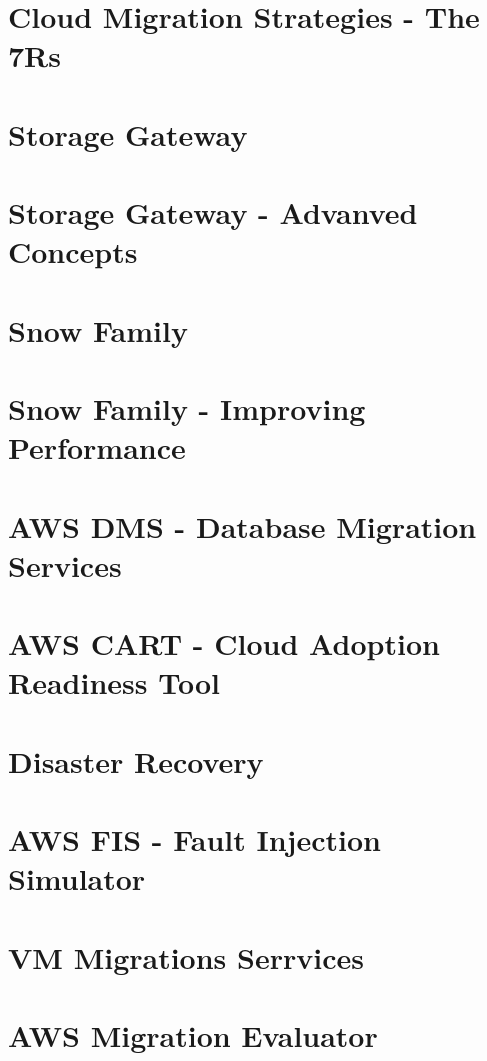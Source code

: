 \documentclass[11pt]{book}
\begin{document}
    \section{Cloud Migration Strategies - The 7Rs}


    \section{Storage Gateway}


    \section{Storage Gateway - Advanved Concepts}


    \section{Snow Family}


    \section{Snow Family - Improving Performance}


    \section{AWS DMS - Database Migration Services}


    \section{AWS CART - Cloud Adoption Readiness Tool}


    \section{Disaster Recovery}


    \section{AWS FIS - Fault Injection Simulator}


    \section{VM Migrations Serrvices}


    \section{AWS Migration Evaluator}
\end{document}
